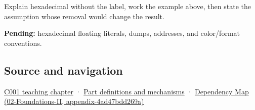 Explain hexadecimal without the label, work the example above, then state the assumption whose removal would change the result.

\textbf{Pending:} hexadecimal floating literals, dumps, addresses, and color/format conventions.

\subsection{Source and navigation}\label{appendix-6b8075763724-source-and-navigation}

\hyperref[01-foundations-i-ch001-from-a-signal-to-an-interpretation]{C001 teaching chapter} · \hyperref[appendix-fd090d982a15]{Part definitions and mechanisms} · \href{../02-Foundations-II/main.pdf\#nameddest=appendix-4ad47bdd269a}{Dependency Map (02-Foundations-II, appendix-4ad47bdd269a)}
